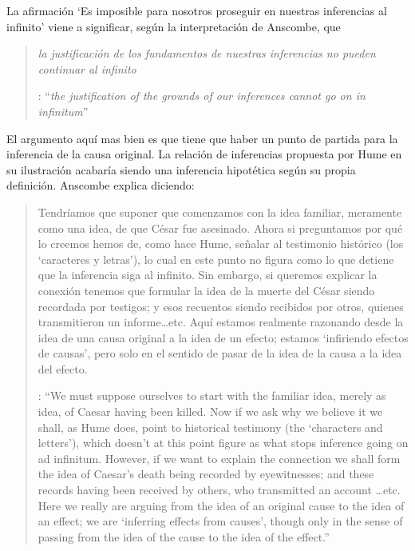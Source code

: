 La afirmación \enquote*{Es imposible para nosotros proseguir en nuestras inferencias al infinito} viene a significar, según la interpretación de Anscombe, que \blockquote[{\cite[Cf.~][87]{anscombe1981parmenides:humeandjulius}}: \enquote{\emph{the justification of the grounds of our inferences cannot go on in infinitum}}]{\emph{la justificación de los fundamentos de nuestras inferencias no pueden continuar al infinito}}. El argumento aquí mas bien es que tiene que haber un punto de partida para la inferencia de la causa original. La relación de inferencias propuesta por Hume en su ilustración acabaría siendo una inferencia hipotética según su propia definición. Anscombe explica diciendo: \blockquote[{\cite[117]{anscombe2011plato:humecaus}}: \enquote{We must suppose ourselves to start with the familiar idea, merely as idea, of Caesar having been killed. Now if we ask why we believe it we shall, as Hume does, point to historical testimony (the ‘characters and letters’), which doesn’t at this point figure as what stops inference going on ad infinitum. However, if we want to explain the connection we shall form the idea of Caesar’s death being recorded by eyewitnesses; and these records having been received by others, who transmitted an account \ldots etc. Here we really are arguing from the idea of an original cause to the idea of an effect; we are ‘inferring effects from causes’, though only in the sense of passing from the idea of the cause to the idea of the effect.}]{Tendríamos que suponer que comenzamos con la idea familiar, meramente como una idea, de que César fue asesinado. Ahora si preguntamos por qué lo creemos hemos de, como hace Hume, señalar al testimonio histórico (los `caracteres y letras'), lo cual en este punto no figura como lo que detiene que la inferencia siga al infinito. Sin embargo, si queremos explicar la conexión tenemos que formular la idea de la muerte del César siendo recordada por testigos; y esos recuentos siendo recibidos por otros, quienes transmitieron un informe\ldots etc. Aquí estamos realmente razonando desde la idea de una causa original a la idea de un efecto; estamos `infiriendo efectos de causas', pero solo en el sentido de pasar de la idea de la causa a la idea del efecto.}

